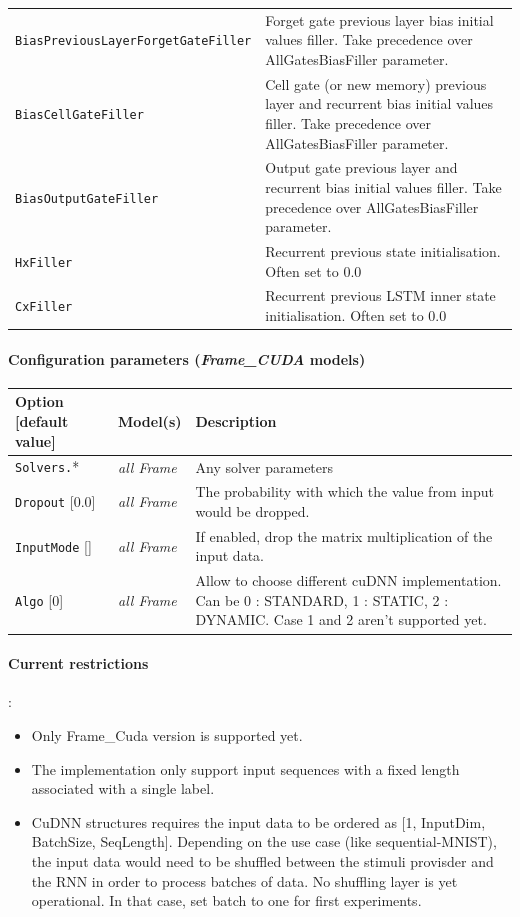 \documentclass[a4paper,11pt,oneside]{article}
\begin{document}
\begin{center}
\begin{longtable}{| p{5cm} | p{10cm} | }
  \lstinline!BiasPreviousLayerForgetGateFiller! & Forget gate previous layer bias initial values filler. Take precedence over AllGatesBiasFiller parameter.\\
  \lstinline!BiasCellGateFiller! & Cell gate (or new memory) previous layer and recurrent bias initial values filler. Take precedence over AllGatesBiasFiller parameter.\\
  \lstinline!BiasOutputGateFiller! & Output gate previous layer and recurrent bias initial values filler. Take precedence over AllGatesBiasFiller parameter.\\
  \lstinline!HxFiller! & Recurrent previous state initialisation. Often set to 0.0\\
  \lstinline!CxFiller! & Recurrent previous LSTM inner state initialisation. Often set to 0.0\\
  \hline
\end{longtable}
\end{center}

\paragraph{Configuration parameters (\emph{Frame\_CUDA} models)}

\begin{center}
 \begin{longtable}{| p{4cm} | p{3cm} | p{9cm} | }
 \hline
 Option [default value] & Model(s) & Description\\
 \hline\hline
  \lstinline!Solvers.!* & \emph{all Frame} & Any solver parameters \\
  \lstinline!Dropout! [0.0] & \emph{all Frame} & The probability with which the value from input would be dropped. \\
  \lstinline!InputMode! [] & \emph{all Frame} & If enabled, drop the matrix multiplication of the input data.\\
  \lstinline!Algo! [0] & \emph{all Frame} & Allow to choose different cuDNN implementation. Can be 0 : STANDARD, 1 : STATIC, 2 : DYNAMIC. Case 1 and 2 aren't supported yet. \\
 \hline
\end{longtable}
\end{center}


\paragraph{Current restrictions}:
\begin{itemize}
\item Only Frame\_Cuda version is supported yet.
\item The implementation only support input sequences with a fixed length associated with a single label.
\item CuDNN structures requires the input data to be ordered as [1, InputDim, BatchSize, SeqLength]. Depending on the use case (like sequential-MNIST), the input data would need to be shuffled between the stimuli provisder and the RNN in order to process batches of data. No shuffling layer is yet operational. In that case, set batch to one for first experiments.
\end{itemize}
\end{document}
